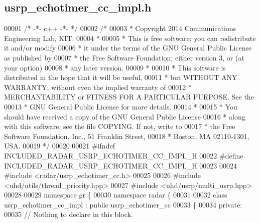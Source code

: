 \subsection{usrp\+\_\+echotimer\+\_\+cc\+\_\+impl.\+h}
\label{usrp__echotimer__cc__impl_8h_source}

\begin{DoxyCode}
00001 \textcolor{comment}{/* -*- c++ -*- */}
00002 \textcolor{comment}{/* }
00003 \textcolor{comment}{ * Copyright 2014 Communications Engineering Lab, KIT.}
00004 \textcolor{comment}{ * }
00005 \textcolor{comment}{ * This is free software; you can redistribute it and/or modify}
00006 \textcolor{comment}{ * it under the terms of the GNU General Public License as published by}
00007 \textcolor{comment}{ * the Free Software Foundation; either version 3, or (at your option)}
00008 \textcolor{comment}{ * any later version.}
00009 \textcolor{comment}{ * }
00010 \textcolor{comment}{ * This software is distributed in the hope that it will be useful,}
00011 \textcolor{comment}{ * but WITHOUT ANY WARRANTY; without even the implied warranty of}
00012 \textcolor{comment}{ * MERCHANTABILITY or FITNESS FOR A PARTICULAR PURPOSE.  See the}
00013 \textcolor{comment}{ * GNU General Public License for more details.}
00014 \textcolor{comment}{ * }
00015 \textcolor{comment}{ * You should have received a copy of the GNU General Public License}
00016 \textcolor{comment}{ * along with this software; see the file COPYING.  If not, write to}
00017 \textcolor{comment}{ * the Free Software Foundation, Inc., 51 Franklin Street,}
00018 \textcolor{comment}{ * Boston, MA 02110-1301, USA.}
00019 \textcolor{comment}{ */}
00020  
00021 \textcolor{preprocessor}{#ifndef INCLUDED\_RADAR\_USRP\_ECHOTIMER\_CC\_IMPL\_H}
00022 \textcolor{preprocessor}{#define INCLUDED\_RADAR\_USRP\_ECHOTIMER\_CC\_IMPL\_H}
00023 
00024 \textcolor{preprocessor}{#include <radar/usrp_echotimer_cc.h>}
00025 
00026 \textcolor{preprocessor}{#include <uhd/utils/thread\_priority.hpp>}
00027 \textcolor{preprocessor}{#include <uhd/usrp/multi\_usrp.hpp>}
00028 
00029 \textcolor{keyword}{namespace }gr \{
00030   \textcolor{keyword}{namespace }radar \{
00031 
00032     \textcolor{keyword}{class }usrp_echotimer_cc_impl : \textcolor{keyword}{public} usrp_echotimer_cc
00033     \{
00034      \textcolor{keyword}{private}:
00035       \textcolor{comment}{// Nothing to declare in this block.}

\end{DoxyCode}
